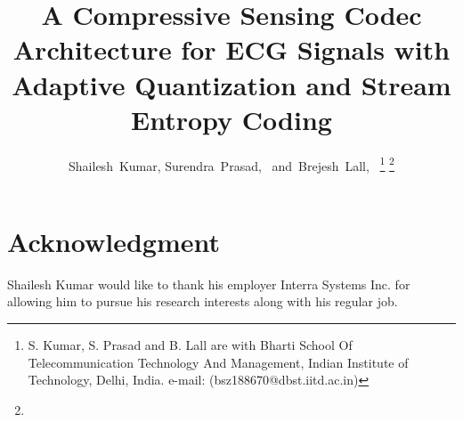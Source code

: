 \documentclass[journal, a4paper]{IEEEtran} %
\begin{document}
\title{A Compressive Sensing Codec Architecture for ECG Signals
with Adaptive Quantization and Stream Entropy Coding}


\author{Shailesh~Kumar,
        Surendra~Prasad,~
        and~Brejesh~Lall,~%
\thanks{S. Kumar, S. Prasad and B. Lall are with 
Bharti School Of Telecommunication Technology And Management, Indian Institute of Technology, Delhi,
India. e-mail: (bsz188670@dbst.iitd.ac.in)}%
\thanks{
}}

\maketitle


\IEEEpeerreviewmaketitle







% 

\section*{Acknowledgment}
Shailesh Kumar would like to thank his employer Interra Systems Inc.
for allowing him to pursue his research interests along with his regular job.




\ifCLASSOPTIONcaptionsoff
  \newpage
\fi





\end{document}
